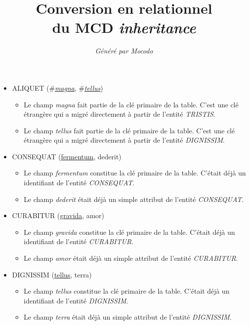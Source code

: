 \documentclass[a4paper]{article}
\title{Conversion en relationnel\\du MCD \emph{inheritance}}
\author{\emph{Généré par Mocodo}}
\newcommand{\relat}[1]{\textsc{#1}}
\newcommand{\attr}[1]{#1}
\newcommand{\prim}[1]{\uline{#1}}
\newcommand{\foreign}[1]{\#\textsl{#1}}
\begin{document}
\maketitle

\begin{itemize}
  \item \relat{ALIQUET} (\foreign{\prim{magna}}, \foreign{\prim{tellus}})
  \begin{itemize}
    \item Le champ \emph{magna} fait partie de la clé primaire de la table. C'est une clé étrangère qui a migré directement à partir de l'entité \emph{TRISTIS}.
    \item Le champ \emph{tellus} fait partie de la clé primaire de la table. C'est une clé étrangère qui a migré directement à partir de l'entité \emph{DIGNISSIM}.
  \end{itemize}

  \item \relat{CONSEQUAT} (\prim{fermentum}, \attr{dederit})
  \begin{itemize}
    \item Le champ \emph{fermentum} constitue la clé primaire de la table. C'était déjà un identifiant de l'entité \emph{CONSEQUAT}.
    \item Le champ \emph{dederit} était déjà un simple attribut de l'entité \emph{CONSEQUAT}.
  \end{itemize}

  \item \relat{CURABITUR} (\prim{gravida}, \attr{amor})
  \begin{itemize}
    \item Le champ \emph{gravida} constitue la clé primaire de la table. C'était déjà un identifiant de l'entité \emph{CURABITUR}.
    \item Le champ \emph{amor} était déjà un simple attribut de l'entité \emph{CURABITUR}.
  \end{itemize}

  \item \relat{DIGNISSIM} (\prim{tellus}, \attr{terra})
  \begin{itemize}
    \item Le champ \emph{tellus} constitue la clé primaire de la table. C'était déjà un identifiant de l'entité \emph{DIGNISSIM}.
    \item Le champ \emph{terra} était déjà un simple attribut de l'entité \emph{DIGNISSIM}.
  \end{itemize}


\end{itemize}
\end{document}
